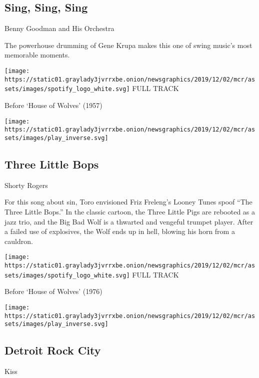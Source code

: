 \hypertarget{sing-sing-sing}{%
\subsection{Sing, Sing, Sing}\label{sing-sing-sing}}

Benny Goodman and His Orchestra

The powerhouse drumming of Gene Krupa makes this one of swing music's
most memorable moments.

\href{https://open.spotify.com/track/5L8ta4ECl5zeA6bGqY7G38?si=1B8cC2sgTYuIKJyMRnYxCQ}{}

\texttt{[image: https://static01.graylady3jvrrxbe.onion/newsgraphics/2019/12/02/mcr/assets/images/spotify\_logo\_white.svg]}
FULL TRACK

Before `House of Wolves' (1957)

\texttt{[image: https://static01.graylady3jvrrxbe.onion/newsgraphics/2019/12/02/mcr/assets/images/play\_inverse.svg]}

\hypertarget{three-little-bops}{%
\subsection{Three Little Bops}\label{three-little-bops}}

Shorty Rogers

For this song about sin, Toro envisioned Friz Freleng's Looney Tunes
spoof ``The Three Little Bops.'' In the classic cartoon, the Three
Little Pigs are rebooted as a jazz trio, and the Big Bad Wolf is a
thwarted and vengeful trumpet player. After a failed use of explosives,
the Wolf ends up in hell, blowing his horn from a cauldron.

\href{https://open.spotify.com/track/2Ki21NWooDIlAIO7V8WqxZ?si=xMijs7MfQlSazYGi-lrepg}{}

\texttt{[image: https://static01.graylady3jvrrxbe.onion/newsgraphics/2019/12/02/mcr/assets/images/spotify\_logo\_white.svg]}
FULL TRACK

Before `House of Wolves' (1976)

\texttt{[image: https://static01.graylady3jvrrxbe.onion/newsgraphics/2019/12/02/mcr/assets/images/play\_inverse.svg]}

\hypertarget{detroit-rock-city}{%
\subsection{Detroit Rock City}\label{detroit-rock-city}}

Kiss

